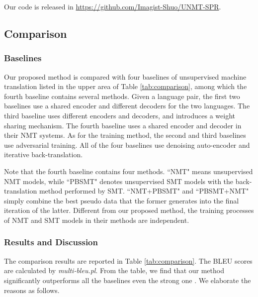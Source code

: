 \documentclass[letterpaper]{article} \usepackage{aaai19}  \usepackage{times}  \usepackage{helvet}  \usepackage{courier}  \usepackage{url}  \usepackage{graphicx}  \usepackage{amsmath}
\begin{document}
Our code is released in \url{https://github.com/Imagist-Shuo/UNMT-SPR}.

\subsection{Comparison}
\label{comparison}
\subsubsection{Baselines}
Our proposed method is compared with four baselines of unsupervised machine translation listed in the upper area of Table \ref{tab:comparison}, among which the fourth baseline contains several methods. Given a language pair, the first two baselines \cite{artetxe2017unsupervised,lample2017unsupervised} use a shared encoder and different decoders for the two languages. The third baseline \cite{yang2018unsupervised} uses different encoders and decoders, and introduces a weight sharing mechanism. The fourth baseline \cite{lample2018phrase} uses a shared encoder and decoder in their NMT systems. As for the training method, the second and third baselines use adversarial training. All of the four baselines use denoising auto-encoder and iterative back-translation.

Note that the fourth baseline contains four methods. ``NMT" means unsupervised NMT models, while ``PBSMT" denotes unsupervised SMT models with the back-translation method performed by SMT. ``NMT+PBSMT" and ``PBSMT+NMT" simply combine the best pseudo data that the former generates into the final iteration of the latter. Different from our proposed method, the training processes of NMT and SMT models in their methods are independent. 
 
\subsubsection{Results and Discussion}
The comparison results are reported in Table \ref{tab:comparison}. The BLEU scores are calculated by \emph{multi-bleu.pl}. From the table, we find that our method significantly outperforms all the baselines even the strong one \cite{lample2018phrase}. We elaborate the reasons as follows.
\end{document}
